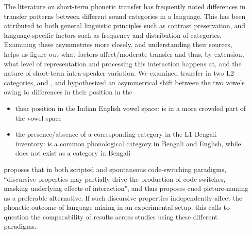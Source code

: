 The literature on short-term phonetic transfer has frequently noted differences in transfer patterns between different sound categories in a language. This has been attributed to both general linguistic principles such as contrast preservation, and language-specific factors such as frequency and distribution of categories. Examining these asymmetries more closely, and understanding their sources, helps us figure out what factors affect/moderate transfer and thus, by extension, what level of representation and processing this interaction happens at, and the nature of short-term intra-speaker variation. 
We examined transfer in two L2 categories,  and \nt{\ae}, and hypothesized an asymmetrical shift between the two vowels owing to  differences in their position in the
\begin{itemize}
	\item their position in the Indian English vowel space: \nt{\ae} is in a more crowded part of the vowel space
	\item the presence/absence of a corresponding category in the L1 Bengali inventory: \nt{\ae} is a common phonological category in Bengali and English, while  does not exist as a category in Bengali
\end{itemize}


\cite{olson2013bilingual} proposes that in both scripted and spontaneous code-switching paradigms, ``discursive properties may partially drive the production of code-switches, masking underlying effects of interaction", and thus proposes cued picture-naming as a preferable alternative. If such discursive properties independently affect the phonetic outcome of language mixing in an experimental setup, this calls to question the comparability of results across studies using these different paradigms. 